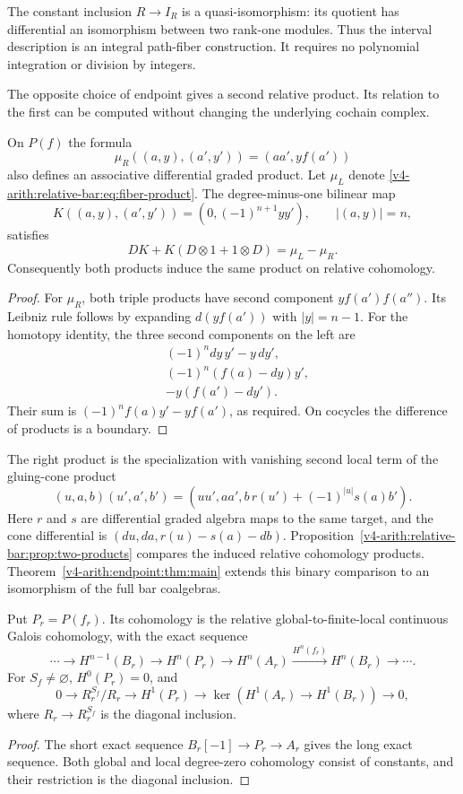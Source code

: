The constant inclusion $R\to I_R$ is a quasi-isomorphism: its quotient
has differential an isomorphism between two rank-one modules. Thus
the interval description is an integral path-fiber construction.
It requires no polynomial integration or division by integers.

The opposite choice of endpoint gives a second relative product.
Its relation to the first can be computed without changing the
underlying cochain complex.

\begin{proposition}\label{v4-arith:relative-bar:prop:two-products}
On $P(f)$ the formula
\[
 \mu_R((a,y),(a',y'))=(aa',y f(a'))
\]
also defines an associative differential graded product. Let $\mu_L$
denote \eqref{v4-arith:relative-bar:eq:fiber-product}. The degree-minus-one bilinear map
\[
 K((a,y),(a',y'))=(0,(-1)^{n+1}yy'),\qquad |(a,y)|=n,
\]
satisfies
\[
 DK+K(D\otimes1+1\otimes D)=\mu_L-\mu_R.
\]
Consequently both products induce the same product on relative
cohomology.
\end{proposition}
\begin{proof}
For $\mu_R$, both triple products have second component
$y f(a')f(a'')$. Its Leibniz rule follows by expanding
$d(y f(a'))$ with $|y|=n-1$. For the homotopy identity, the three
second components on the left are
\[
 \begin{split}
 &(-1)^n dy\,y'-y\,dy',\\
 &(-1)^n(f(a)-dy)y',\\
 &-y(f(a')-dy').
 \end{split}
\]
Their sum is $(-1)^nf(a)y'-y f(a')$, as required.
On cocycles the difference of products is a boundary.
\end{proof}

The right product is the specialization with vanishing second local
term of the gluing-cone product
\[
 (u,a,b)(u',a',b')
 =(uu',aa',b\,r(u')+(-1)^{|u|}s(a)b').
\]
Here $r$ and $s$ are differential graded algebra maps to the same
target, and the cone differential is
$(du,da,r(u)-s(a)-db)$. Proposition~\ref{v4-arith:relative-bar:prop:two-products} compares
the induced relative cohomology products. Theorem~\ref{v4-arith:endpoint:thm:main} extends this binary comparison to an isomorphism of the full bar coalgebras.

\begin{corollary}\label{v4-arith:relative-bar:cor:relative}
Put $P_r=P(f_r)$. Its cohomology is the relative global-to-finite-local
continuous Galois cohomology, with the exact sequence
\[
 \cdots\to H^{n-1}(B_r)\to H^n(P_r)\to H^n(A_r)
 \xrightarrow{H^n(f_r)}H^n(B_r)\to\cdots.
\]
For $S_f\ne\varnothing$, $H^0(P_r)=0$, and
\[
 0\longrightarrow R_r^{S_f}/R_r
 \longrightarrow H^1(P_r)
 \longrightarrow\ker(H^1(A_r)\to H^1(B_r))
 \longrightarrow0,
\]
where $R_r\to R_r^{S_f}$ is the diagonal inclusion.
\end{corollary}
\begin{proof}
The short exact sequence $B_r[-1]\to P_r\to A_r$ gives the long
exact sequence. Both global and local degree-zero cohomology consist
of constants, and their restriction is the diagonal inclusion.
\end{proof}

